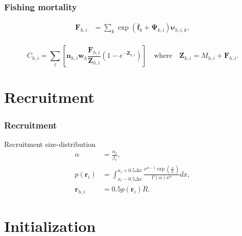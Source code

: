 \documentclass{beamer}
\begin{document}

\begin{frame}
\frametitle{Fishing mortality}
\begin{align*}
  \boldsymbol{F}_{h,i} &= \sum_k \exp \left( \bar{\boldsymbol{f}}_k +
    \boldsymbol\Psi_{k,i} \right) \boldsymbol\nu_{h,i,k},\\
\end{align*}

\begin{equation*}
  C_{h,i} = \sum_{\ell} \left[ \boldsymbol{n}_{h,i} \boldsymbol{w}_{h} \frac{\boldsymbol{F}_{h,i}}{\boldsymbol{Z}_{h,i}} 
    \left( 1 - e^{-\boldsymbol{Z}_{h,i}} \right) \right] \quad \text{where} \quad \boldsymbol{Z}_{h,i}
  = M_{h,i} + \boldsymbol{F}_{h,i}.
\end{equation*}

\end{frame}


\section{Recruitment}


\begin{frame}
\frametitle{Recruitment}
Recruitment size-distribution
\begin{align*}
  \alpha &= \frac{\alpha_r}{\beta_r},\\
  p(\boldsymbol{r}_i) &= \int^{x_\ell+0.5 \Delta x}_{x_\ell-0.5 \Delta x}
  \frac{x^{\alpha-1} \exp
    \left(\frac{x}{\beta_r}\right)}{\Gamma (\alpha) x^\alpha} dx,\\
  \boldsymbol{r}_{h,i} &= 0.5 p(\boldsymbol{r}_i) \ddot{R}.
\end{align*}
\end{frame}


\section{Initialization}
\end{document}
